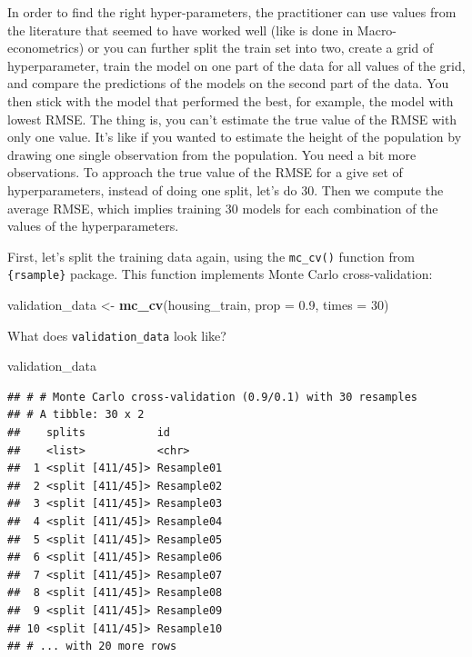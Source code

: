\documentclass[]{gitbook}
\newenvironment{Shaded}{\begin{snugshade}}{\end{snugshade}}
\newcommand{\DataTypeTok}[1]{\textcolor[rgb]{0.13,0.29,0.53}{#1}}
\newcommand{\DecValTok}[1]{\textcolor[rgb]{0.00,0.00,0.81}{#1}}
\newcommand{\FloatTok}[1]{\textcolor[rgb]{0.00,0.00,0.81}{#1}}
\newcommand{\KeywordTok}[1]{\textcolor[rgb]{0.13,0.29,0.53}{\textbf{#1}}}
\newcommand{\NormalTok}[1]{#1}
\newcommand{\StringTok}[1]{\textcolor[rgb]{0.31,0.60,0.02}{#1}}
\begin{document}
In order to find the right hyper-parameters, the practitioner can
use values from the literature that seemed to have worked well (like is done in Macro-econometrics)
or you can further split the train set into two, create a grid of hyperparameter, train the model
on one part of the data for all values of the grid, and compare the predictions of the models on the
second part of the data. You then stick with the model that performed the best, for example, the
model with lowest RMSE. The thing is, you can't estimate the true value of the RMSE with only
one value. It's like if you wanted to estimate the height of the population by drawing one single
observation from the population. You need a bit more observations. To approach the true value of the
RMSE for a give set of hyperparameters, instead of doing one split, let's do 30. Then we
compute the average RMSE, which implies training 30 models for each combination of the values of the
hyperparameters.

First, let's split the training data again, using the \texttt{mc\_cv()} function from \texttt{\{rsample\}} package.
This function implements Monte Carlo cross-validation:

\begin{Shaded}
\begin{Highlighting}[]
\NormalTok{validation_data <-}\StringTok{ }\KeywordTok{mc_cv}\NormalTok{(housing_train, }\DataTypeTok{prop =} \FloatTok{0.9}\NormalTok{, }\DataTypeTok{times =} \DecValTok{30}\NormalTok{)}
\end{Highlighting}
\end{Shaded}

What does \texttt{validation\_data} look like?

\begin{Shaded}
\begin{Highlighting}[]
\NormalTok{validation_data}
\end{Highlighting}
\end{Shaded}

\begin{verbatim}
## # # Monte Carlo cross-validation (0.9/0.1) with 30 resamples  
## # A tibble: 30 x 2
##    splits           id        
##    <list>           <chr>     
##  1 <split [411/45]> Resample01
##  2 <split [411/45]> Resample02
##  3 <split [411/45]> Resample03
##  4 <split [411/45]> Resample04
##  5 <split [411/45]> Resample05
##  6 <split [411/45]> Resample06
##  7 <split [411/45]> Resample07
##  8 <split [411/45]> Resample08
##  9 <split [411/45]> Resample09
## 10 <split [411/45]> Resample10
## # ... with 20 more rows
\end{verbatim}
\end{document}
